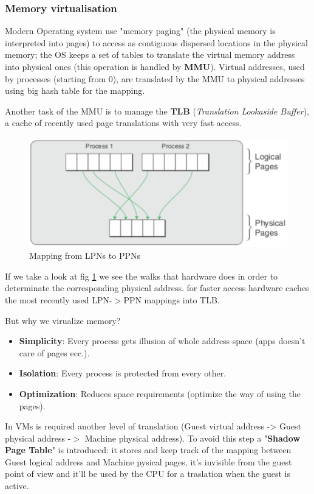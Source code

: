 

\subsubsection{Memory virtualisation}
Modern Operating system use "memory paging" (the physical memory is interpreted into pages) to access as contiguous dispersed locations in the physical memory; the OS keeps a set of tables to translate the virtual memory address into physical ones (this operation is handled by \textbf{MMU}). Virtual addresses, used by processes (starting from 0), are translated by the MMU to physical addresses using big hash table for the mapping.




Another task of the MMU is to manage the \textbf{TLB} (\textit{Translation Lookaside Buffer}), a cache of recently used page translations with very fast access.

\begin{figure}[b]
    \centering
    \includegraphics[scale=0.3]{images/mapping_mm.png}
    \caption{Mapping from LPNs to PPNs}
    \label{fig:mapping_mm}
\end{figure}

If we take a look at fig \ref{fig:mapping_mm} we see the walks that hardware does in order to determinate the corresponding physical address. for faster access hardware caches the most recently used LPN-$>$PPN mappings into TLB.

But why we virualize memory?
\begin{itemize}
    \item \textbf{Simplicity}: Every process gets illusion of whole address space (apps doesn't care of pages ecc.).
    \item \textbf{Isolation}: Every process is protected from every other.
    \item \textbf{Optimization}: Reduces space requirements (optimize the way of using the pages).
\end{itemize}
In VMs is required another level of translation (Guest virtual address -> Guest physical address -$>$ Machine physical address). To avoid this step a "\textbf{Shadow Page Table}" is introduced: it stores and keep track of the mapping between Guest logical address and Machine pysical pages, it's invisible from the guest point of view and it'll be used by the CPU for a traslation when the guest is active.

